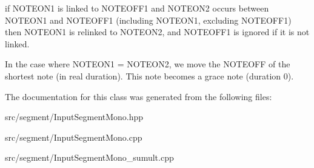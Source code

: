 if N\+O\+T\+E\+O\+N1 is linked to N\+O\+T\+E\+O\+F\+F1 and N\+O\+T\+E\+O\+N2 occurs between N\+O\+T\+E\+O\+N1 and N\+O\+T\+E\+O\+F\+F1 (including N\+O\+T\+E\+O\+N1, excluding N\+O\+T\+E\+O\+F\+F1) then N\+O\+T\+E\+O\+N1 is relinked to N\+O\+T\+E\+O\+N2, and N\+O\+T\+E\+O\+F\+F1 is ignored if it is not linked.

In the case where N\+O\+T\+E\+O\+N1 = N\+O\+T\+E\+O\+N2, we move the N\+O\+T\+E\+O\+FF of the shortest note (in real duration). This note becomes a grace note (duration 0). 

The documentation for this class was generated from the following files\+:\begin{DoxyCompactItemize}
\item 
src/segment/Input\+Segment\+Mono.\+hpp\item 
src/segment/Input\+Segment\+Mono.\+cpp\item 
src/segment/Input\+Segment\+Mono\+\_\+sumult.\+cpp\end{DoxyCompactItemize}
